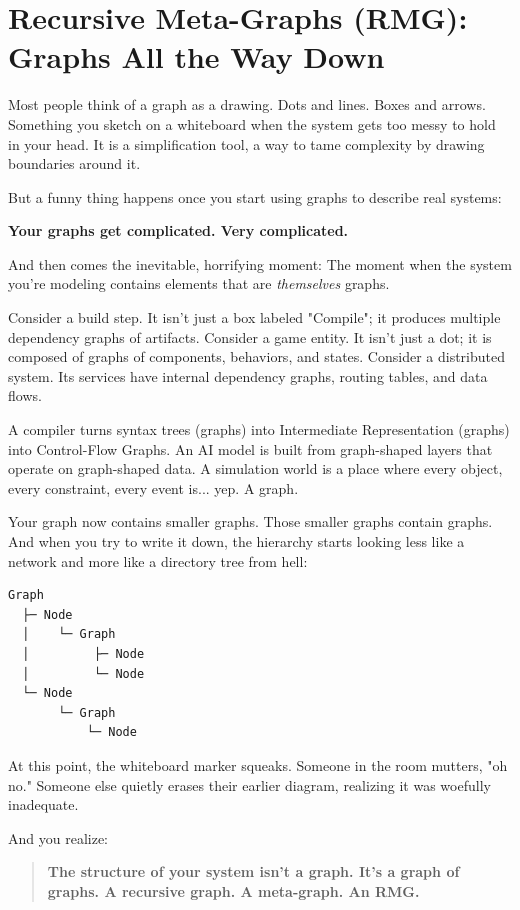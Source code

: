 \chapter{Recursive Meta-Graphs (RMG): Graphs All the Way Down}
\label{chap:recursive-meta-graphs}

Most people think of a graph as a drawing. Dots and lines. Boxes and arrows. Something you sketch on a whiteboard when the system gets too messy to hold in your head. It is a simplification tool, a way to tame complexity by drawing boundaries around it.

But a funny thing happens once you start using graphs to describe real systems:

\textbf{Your graphs get complicated. Very complicated.}

And then comes the inevitable, horrifying moment: The moment when the system you're modeling contains elements that are \textit{themselves} graphs.

Consider a build step. It isn't just a box labeled "Compile"; it produces multiple dependency graphs of artifacts. Consider a game entity. It isn't just a dot; it is composed of graphs of components, behaviors, and states. Consider a distributed system. Its services have internal dependency graphs, routing tables, and data flows.

A compiler turns syntax trees (graphs) into Intermediate Representation (graphs) into Control-Flow Graphs. An AI model is built from graph-shaped layers that operate on graph-shaped data. A simulation world is a place where every object, every constraint, every event is... yep. A graph.

Your graph now contains smaller graphs. Those smaller graphs contain graphs. And when you try to write it down, the hierarchy starts looking less like a network and more like a directory tree from hell:

\begin{lstlisting}[language=bash]
Graph
  ├─ Node
  │    └─ Graph
  │         ├─ Node
  │         └─ Node
  └─ Node
       └─ Graph
           └─ Node
\end{lstlisting}

At this point, the whiteboard marker squeaks. Someone in the room mutters, "oh no." Someone else quietly erases their earlier diagram, realizing it was woefully inadequate.

And you realize:

\begin{quote}
\textbf{The structure of your system isn't a graph. It's a graph of graphs. A recursive graph. A meta-graph. An RMG.}
\end{quote}

